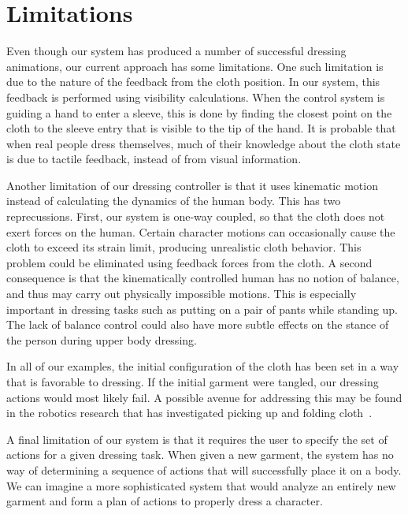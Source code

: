 \section{Limitations}
Even though our system has produced a number of successful dressing
animations, our current approach has some limitations.  One such
limitation is due to the nature of the feedback from the cloth position.
In our system, this feedback is performed using visibility calculations.
When the control system is guiding a hand to enter a sleeve, this is done
by finding the closest point on the cloth to the sleeve entry that is
visible to the tip of the hand.  It is probable that when real people
dress themselves, much of their knowledge about the cloth state is due
to tactile feedback, instead of from visual information.

Another limitation of our dressing controller is that it uses kinematic
motion instead of calculating the dynamics of the human body.  This has
two reprecussions.  First, our system is one-way coupled, so that the
cloth does not exert forces on the human.  Certain character motions can
occasionally cause the cloth to exceed its strain limit, producing
unrealistic cloth behavior.  This problem could be eliminated using
feedback forces from the cloth.  A second consequence is that the
kinematically controlled human has no notion of balance, and thus may
carry out physically impossible motions.  This is especially important in
dressing tasks such as putting on a pair of pants while standing up.  The
lack of balance control could also have more subtle effects on the stance
of the person during upper body dressing.

In all of our examples, the initial configuration of the cloth has been
set in a way that is favorable to dressing.  If the initial garment were
tangled, our dressing actions would most likely fail.  A possible avenue
for addressing this may be found in the robotics research that has
investigated picking up and folding cloth~\cite{Cusumano:2011:BCD}.

A final limitation of our system is that it requires the user to specify
the set of actions for a given dressing task.  When given a new garment,
the system has no way of determining a sequence of actions that will
successfully place it on a body.  We can imagine a more sophisticated
system that would analyze an entirely new garment and form a plan of
actions to properly dress a character.  

